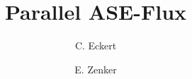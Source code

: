 \documentclass[3p,twocolumn]{elsarticle}
\begin{document}
\title{Parallel ASE-Flux}

\author[hzdr]{C. Eckert}

\author[hzdr]{E. Zenker}

\address[hzdr]{
  Institute of Radiation Physics, 
  Helmholtz-Zentrum Dresden-Rossendorf e. V.,
  Bautzner Landstraße 400,
  01328 Dresden,  
  Germany
}




\maketitle





		


\end{document}
